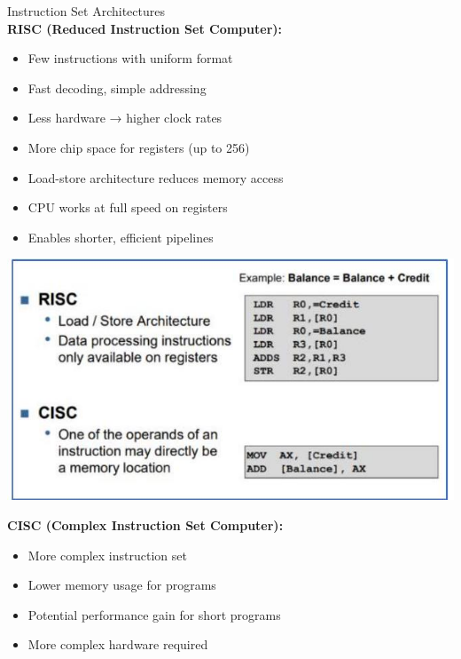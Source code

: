 \begin{concept}{Instruction Set Architectures}\\
\textbf{RISC (Reduced Instruction Set Computer):}
\begin{itemize}
  \item Few instructions with uniform format
  \item Fast decoding, simple addressing
  \item Less hardware → higher clock rates
  \item More chip space for registers (up to 256)
  \item Load-store architecture reduces memory access
  \item CPU works at full speed on registers
  \item Enables shorter, efficient pipelines 
\end{itemize}

\includegraphics[width=\linewidth]{images/2024_12_29_79e6b22f503fb7b4f718g-13(1)}

\textbf{CISC (Complex Instruction Set Computer):}
\begin{itemize}
  \item More complex instruction set
  \item Lower memory usage for programs
  \item Potential performance gain for short programs
  \item More complex hardware required
\end{itemize}
\end{concept}

